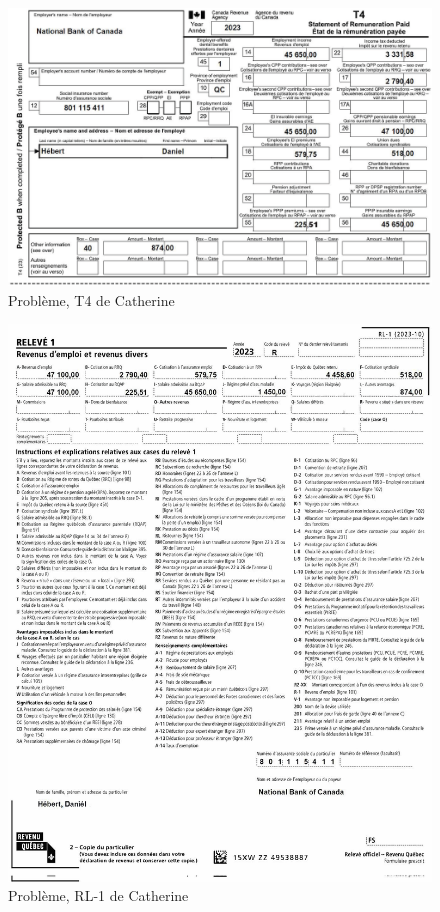 \begin{figure}
	\centering
	\includegraphics[width=.9\textwidth]{probleme/chapitre-4/Daniel-T4.png}
	\caption[]{Problème, T4 de Catherine}
	\label{fig:chap4ProblemeCatherineT4}
\end{figure}
\begin{figure}
	\centering
	\includegraphics[width=.9\textwidth]{probleme/chapitre-4/Daniel-RL1.png}
	\caption[]{Problème, RL-1 de Catherine}
	\label{fig:chap4ProblemeCatherineRL1}
\end{figure}
